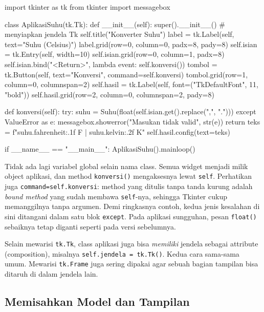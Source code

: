 \begin{kode}
import tkinter as tk
from tkinter import messagebox

class AplikasiSuhu(tk.Tk):
    def __init__(self):
        super().__init__()                    # menyiapkan jendela Tk
        self.title("Konverter Suhu")
        label = tk.Label(self, text="Suhu (Celsius)")
        label.grid(row=0, column=0, padx=8, pady=8)
        self.isian = tk.Entry(self, width=10)
        self.isian.grid(row=0, column=1, padx=8)
        self.isian.bind("<Return>", lambda event: self.konversi())
        tombol = tk.Button(self, text="Konversi", command=self.konversi)
        tombol.grid(row=1, column=0, columnspan=2)
        self.hasil = tk.Label(self, font=("TkDefaultFont", 11, "bold"))
        self.hasil.grid(row=2, column=0, columnspan=2, pady=8)

    def konversi(self):
        try:
            suhu = Suhu(float(self.isian.get().replace(",", ".")))
        except ValueError as e:
            messagebox.showerror("Masukan tidak valid", str(e))
            return
        teks = f"{suhu.fahrenheit:.1f} F   |   {suhu.kelvin:.2f} K"
        self.hasil.config(text=teks)

if __name__ == "__main__":
    AplikasiSuhu().mainloop()
\end{kode}

Tidak ada lagi variabel global selain nama class. Semua widget menjadi milik object aplikasi, dan method \texttt{konversi()} mengaksesnya lewat \texttt{self}. Perhatikan juga \texttt{command=self.konversi}: method yang ditulis tanpa tanda kurung adalah \emph{bound method} yang sudah membawa \texttt{self}-nya, sehingga Tkinter cukup memanggilnya tanpa argumen. Demi ringkasnya contoh, kedua jenis kesalahan di sini ditangani dalam satu blok \texttt{except}. Pada aplikasi sungguhan, pesan \texttt{float()} sebaiknya tetap diganti seperti pada versi sebelumnya.

\begin{info}
Selain mewarisi \texttt{tk.Tk}, class aplikasi juga bisa \emph{memiliki} jendela sebagai attribute (composition), misalnya \texttt{self.jendela = tk.Tk()}. Kedua cara sama-sama umum. Mewarisi \texttt{tk.Frame} juga sering dipakai agar sebuah bagian tampilan bisa ditaruh di dalam jendela lain.
\end{info}

\subsection{Memisahkan Model dan Tampilan}

